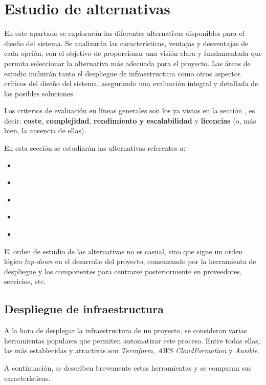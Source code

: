 \section{Estudio de alternativas}\label{sec:estudio}
En este apartado se explorarán las diferentes alternativas disponibles para el
diseño del sistema. Se analizarán las características, ventajas y desventajas de
cada opción, con el objetivo de proporcionar una visión clara y fundamentada que
permita seleccionar la alternativa más adecuada para el proyecto. Las áreas de
estudio incluirán tanto el despliegue de infraestructura como otros aspectos
críticos del diseño del sistema, asegurando una evaluación integral y detallada
de las posibles soluciones.

Los criterios de evaluación en líneas generales son los ya vistos en la sección
, es decir: \textbf{coste}, \textbf{complejidad},
\textbf{rendimiento y escalabilidad} y \textbf{licencias} (o, más bien, la
ausencia de ellas).

En esta sección se estudiarán las alternativas referentes a:

\begin{itemize}
	\item \textbf{}
	\item \textbf{}
	\item \textbf{}
	\item \textbf{}
	\item \textbf{}
\end{itemize}

El orden de estudio de las alternativas no es casual, sino que sigue un orden
lógico \textit{top-down} en el desarrollo del proyecto, comenzando por la
herramienta de despliegue y los componentes para centrarse posteriormente en
proveedores, servicios, etc.


\newpage{}
\subsection{Despliegue de infraestructura}\label{subsec:alt_despliegue}
A la hora de desplegar la infraestructura de un proyecto, se consideran varias
herramientas populares que permiten automatizar este proceso. Entre todas ellas,
las más establecidas y atractivas son \textit{Terraform},
\textit{AWS CloudFormation} y \textit{Ansible}.

A continuación, se describen brevemente estas herramientas y se comparan sus
características.

